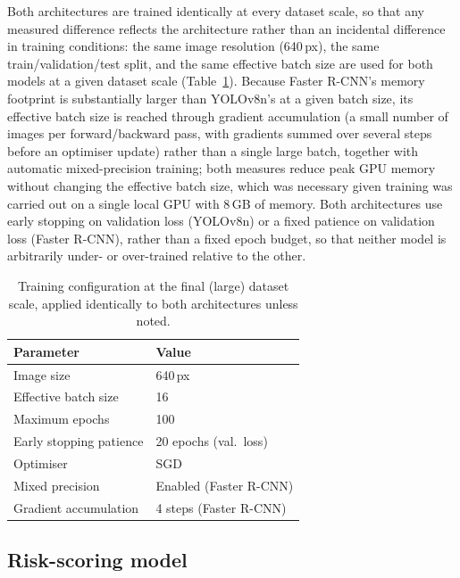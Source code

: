 \documentclass[10pt,a4paper,twocolumn]{article}
\begin{document}
Both architectures are trained identically at every dataset scale, so
that any measured difference reflects the architecture rather than an
incidental difference in training conditions: the same image resolution
(640\,px), the same train/validation/test split, and the same effective
batch size are used for both models at a given dataset scale
(Table~\ref{tab:training-params}). Because Faster R-CNN's memory
footprint is substantially larger than YOLOv8n's at a given batch size,
its effective batch size is reached through gradient accumulation
(a small number of images per forward/backward pass, with gradients
summed over several steps before an optimiser update) rather than a
single large batch, together with automatic mixed-precision training;
both measures reduce peak GPU memory without changing the effective
batch size, which was necessary given training was carried out on a
single local GPU with 8\,GB of memory. Both architectures use early
stopping on validation loss (YOLOv8n) or a fixed patience on validation
loss (Faster R-CNN), rather than a fixed epoch budget, so that neither
model is arbitrarily under- or over-trained relative to the other.

\begin{table}[t]
  \centering
  \small
  \caption{Training configuration at the final (large) dataset scale, applied
  identically to both architectures unless noted.}
  \label{tab:training-params}
  \begin{tabular}{@{}p{3.1cm}p{3.3cm}@{}}
    \toprule
    Parameter & Value \\
    \midrule
    Image size & 640\,px \\
    Effective batch size & 16 \\
    Maximum epochs & 100 \\
    Early stopping patience & 20 epochs (val.\ loss) \\
    Optimiser & SGD \\
    Mixed precision & Enabled (Faster R-CNN) \\
    Gradient accumulation & 4 steps (Faster R-CNN) \\
    \bottomrule
  \end{tabular}
\end{table}

\subsection{Risk-scoring model}
\label{sec:method-risk-scoring}
\end{document}
